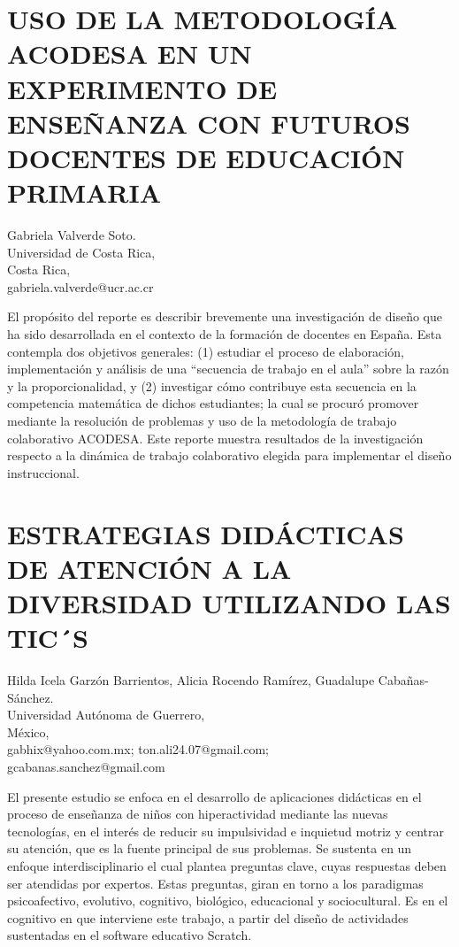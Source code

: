 \section{USO DE LA METODOLOGÍA ACODESA EN UN EXPERIMENTO DE ENSEÑANZA CON
FUTUROS DOCENTES DE EDUCACIÓN PRIMARIA}

\begin{datos}
Gabriela Valverde Soto. \\
 Universidad de Costa Rica, \\
\hfill Costa Rica, \\
\hfill gabriela.valverde@ucr.ac.cr  
\end{datos}

El propósito del reporte es describir brevemente una investigación
de diseño que ha sido desarrollada en el contexto de la formación
de docentes en España. Esta contempla dos objetivos generales: (1)
estudiar el proceso de elaboración, implementación y análisis de una
“secuencia de trabajo en el aula” sobre la razón y la proporcionalidad,
y (2) investigar cómo contribuye esta secuencia en la competencia
matemática de dichos estudiantes; la cual se procuró promover mediante
la resolución de problemas y uso de la metodología de trabajo colaborativo
ACODESA. Este reporte muestra resultados de la investigación respecto
a la dinámica de trabajo colaborativo elegida para implementar el
diseño instruccional. 


\section{ESTRATEGIAS DIDÁCTICAS DE ATENCIÓN A LA DIVERSIDAD UTILIZANDO LAS
TIC´S }

\begin{datos}
Hilda Icela Garzón Barrientos, Alicia Rocendo Ramírez, Guadalupe Cabañas-Sánchez. \\
 Universidad Autónoma de Guerrero, \\
\hfill México, \\
\hfill gabhix@yahoo.com.mx; ton.ali24.07@gmail.com; \\ \hfill gcabanas.sanchez@gmail.com  
\end{datos}

El presente estudio se enfoca en el desarrollo de aplicaciones didácticas
en el proceso de enseñanza de niños con hiperactividad mediante las
nuevas tecnologías, en el interés de reducir su impulsividad e inquietud
motriz y centrar su atención, que es la fuente principal de sus problemas.
Se sustenta en un enfoque interdisciplinario el cual plantea preguntas
clave, cuyas respuestas deben ser atendidas por expertos. Estas preguntas,
giran en torno a los paradigmas psicoafectivo, evolutivo, cognitivo,
biológico, educacional y sociocultural. Es en el cognitivo en que
interviene este trabajo, a partir del diseño de actividades sustentadas
en el software educativo Scratch.


